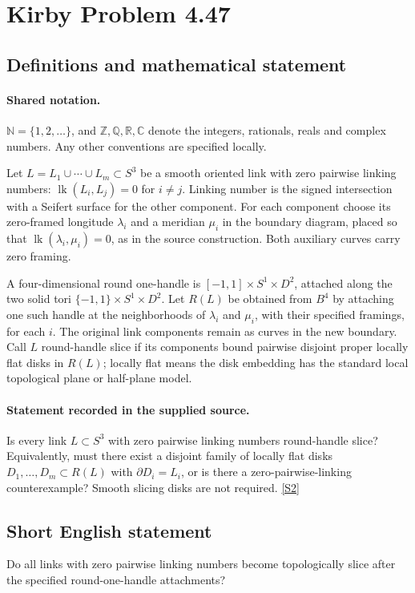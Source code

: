\documentclass[11pt]{article}
\newcommand{\sref}[2]{\hyperlink{source:#1:#2}{[S#2]}}
\begin{document}
\section{Kirby Problem 4.47}\label{statement}

\subsection{Definitions and mathematical statement}

\paragraph{Shared notation.}$\mathbb N=\{1,2,\ldots\}$, and $\mathbb Z,\mathbb Q,\mathbb R,\mathbb C$ denote the integers, rationals, reals and complex numbers. Any other conventions are specified locally.


Let $L=L_1\cup\cdots\cup L_m\subset S^3$ be a smooth oriented link with zero pairwise linking numbers: $\operatorname{lk}(L_i,L_j)=0$ for $i\ne j$. Linking number is the signed intersection with a Seifert surface for the other component. For each component choose its zero-framed longitude $\lambda_i$ and a meridian $\mu_i$ in the boundary diagram, placed so that $\operatorname{lk}(\lambda_i,\mu_i)=0$, as in the source construction. Both auxiliary curves carry zero framing.

A four-dimensional round one-handle is $[-1,1]\times S^1\times D^2$, attached along the two solid tori $\{-1,1\}\times S^1\times D^2$. Let $R(L)$ be obtained from $B^4$ by attaching one such handle at the neighborhoods of $\lambda_i$ and $\mu_i$, with their specified framings, for each $i$. The original link components remain as curves in the new boundary. Call $L$ round-handle slice if its components bound pairwise disjoint proper locally flat disks in $R(L)$; locally flat means the disk embedding has the standard local topological plane or half-plane model.
\paragraph{Statement recorded in the supplied source.}
Is every link $L\subset S^3$ with zero pairwise linking numbers round-handle slice? Equivalently, must there exist a disjoint family of locally flat disks $D_1,\ldots,D_m\subset R(L)$ with $\partial D_i=L_i$, or is there a zero-pairwise-linking counterexample? Smooth slicing disks are not required. \sref{statement}{2}
\subsection{Short English statement}
Do all links with zero pairwise linking numbers become topologically slice after the specified round-one-handle attachments?
\end{document}
